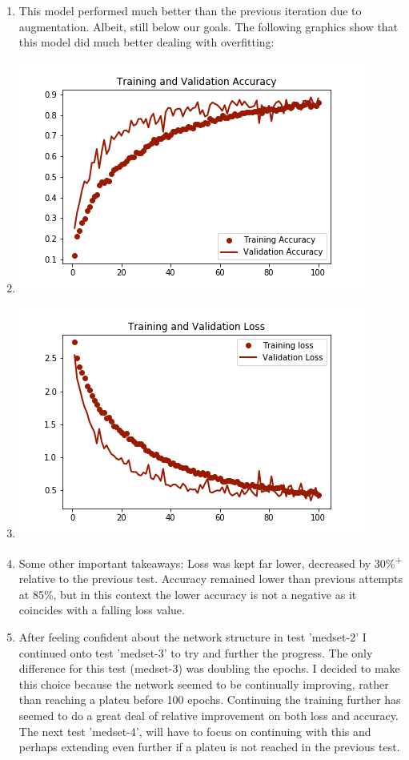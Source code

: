 \documentclass[12pt]{article} %
\begin{document}
\begin{enumerate}[label = (\roman*)]
\item This model performed much better than the previous iteration due to augmentation. Albeit, still below our goals. The following graphics show that this model did much better dealing with overfitting:
\item \includegraphics{train-vs-val-acc-medset2}
\item \includegraphics{train-vs-val-loss-medset2}
\item Some other important takeaways: Loss was kept far lower, decreased by 30\%\textsuperscript{+} relative to the previous test. Accuracy remained lower than previous attempts at 85\%, but in this context the lower accuracy is not a negative as it coincides with a falling loss value.
\item After feeling confident about the network structure in test 'medset-2' I continued onto test 'medset-3' to try and further the progress. The only difference for this test (medset-3) was doubling the epochs. I decided to make this choice because the network seemed to be continually improving, rather than reaching a plateu before 100 epochs. Continuing the training further has seemed to do a great deal of relative improvement on both loss and accuracy. The next test 'medset-4', will have to focus on continuing with this and perhaps extending even further if a plateu is not reached in the previous test.

\end{enumerate}
\end{document}

